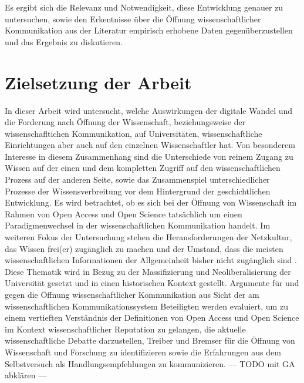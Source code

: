 Es ergibt sich die Relevanz und Notwendigkeit, diese Entwicklung genauer zu untersuchen, sowie den Erkentnisse über die Öffnung wissenschaftlicher Kommunikation aus der Literatur empirisch erhobene Daten gegenüberzustellen und das Ergebnis zu diskutieren.

\section{Zielsetzung der Arbeit} 

In dieser Arbeit wird untersucht, welche Auswirkungen der digitale Wandel und die Forderung nach Öffnung der Wissenschaft, beziehungsweise der wissenschafltichen Kommunikation, auf Universitäten, wissenschaftliche Einrichtungen aber auch auf den einzelnen Wissenschaftler hat. Von besonderem Interesse in diesem Zusammenhang sind die Unterschiede von reinem Zugang zu Wissen auf der einen und dem kompletten Zugriff auf den wissenschaftlichen Prozess auf der anderen Seite, sowie das Zusammenspiel unterschiedlicher Prozesse der Wissensverbreitung vor dem Hintergrund der geschichtlichen Entwicklung. Es wird betrachtet, ob es sich bei der Öffnung von Wissenschaft im Rahmen von Open Access und Open Science tatsächlich um einen Paradigmenwechsel in der wissenschaftlichen Kommunikation handelt. Im weiteren Fokus der Untersuchung stehen die Herausforderungen der Netzkultur, das Wissen frei(er) zugänglich zu machen und der Umstand, dass die meisten wissenschaftlichen Informationen der Allgemeinheit bisher nicht zugänglich sind \cite{cite:6}. Diese Thematik wird in Bezug zu der Massifizierung und Neoliberalisierung der Universität gesetzt und in einen historischen Kontext gestellt. Argumente für und gegen die Öffnung wissenschaftlicher Kommunikation aus Sicht der am wissenschaftlichen Kommunikationssystem Beteiligten werden evaluiert, um zu einem vertieften Verständnis der Definitionen von Open Access und Open Science im Kontext wissenschaftlicher Reputation zu gelangen, die aktuelle wissenschaftliche Debatte darzustellen, Treiber und Bremser für die Öffnung von Wissenschaft und Forschung zu identifizieren sowie die Erfahrungen aus dem Selbstversuch als Handlungsempfehlungen zu kommunizieren. --- TODO mit GA abklären --- 


